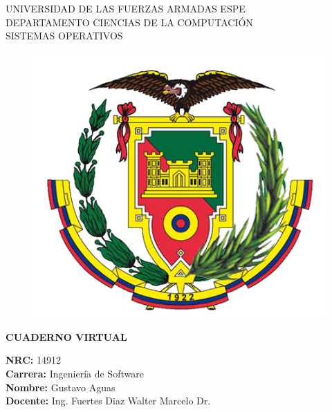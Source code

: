 \documentclass[11pt,twoside]{book}
\begin{document}
\begin{center}
  \LARGE UNIVERSIDAD DE LAS FUERZAS ARMADAS ESPE\\[0.5cm]
  \Large DEPARTAMENTO CIENCIAS DE LA COMPUTACIÓN \\[0.5cm]
  \large SISTEMAS OPERATIVOS\\[0.5cm]
  \begin{figure}[htb] \centering \includegraphics[scale=.6]{Logo_ESPE} \end{figure}
   \vspace{0.5cm}
  \large{\bf CUADERNO VIRTUAL }\\ \vspace{.25cm} 
\end{center}

\begin{flushleft}
  \Large{\bf NRC: } 14912 \textbf{}\\
  \vspace{0.5cm}
  \Large{\bf Carrera:} Ingeniería de Software\\
  \vspace{0.5cm}
  \Large{\bf Nombre: } Gustavo Aguas\\
  \vspace{0.5cm}
  \Large{\bf Docente: } Ing. Fuertes Diaz Walter Marcelo Dr.\\
  \vspace{0.5cm}
  \vspace{0.5cm}
\end{flushleft}
\end{document}
